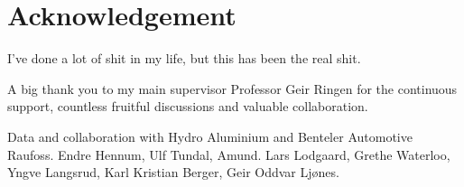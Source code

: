 \chapter*{Acknowledgement}

I've done a lot of shit in my life, but this has been the real shit.

A big thank you to my main supervisor Professor Geir Ringen for the continuous support, countless fruitful discussions and valuable collaboration. 

Data and collaboration with Hydro Aluminium and Benteler Automotive Raufoss. Endre Hennum, Ulf Tundal, Amund. Lars Lodgaard, Grethe Waterloo, Yngve Langsrud, Karl Kristian Berger, Geir Oddvar Ljønes.


